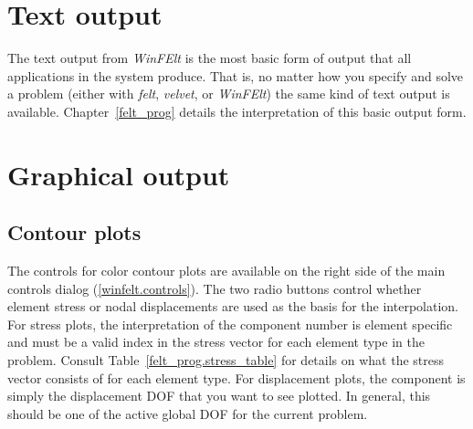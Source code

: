 \section{Text output}

The text output from {\em WinFElt} is the most basic form of output that all 
applications in the \felt{} system produce.  That is, no matter how you specify
and solve a \felt{} problem (either with {\em felt},  
{\em velvet}, or {\em WinFElt}) the same kind of text output is available.
Chapter~\ref{felt_prog} details the interpretation of this basic output form.

\section{Graphical output}

\subsection{Contour plots}

The controls for color contour plots are available on the right side
of the main controls dialog (\ref{winfelt.controls}).
The two radio buttons control whether element stress or nodal
displacements are used as the basis for the interpolation.
For stress plots, the interpretation of the component number is element 
specific and must be a valid index in the stress vector for each element type 
in the problem.  Consult Table~\ref{felt_prog.stress_table} for details on 
what the stress vector consists of for each element type.  For displacement plots,
the component is simply the displacement DOF that you want to see plotted.
In general, this should be one of the active global DOF for the current
problem.

